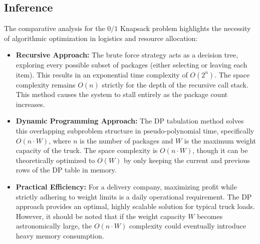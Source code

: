 \documentclass[a4paper,12pt]{article}
\begin{document}
\subsection*{Inference}
The comparative analysis for the $0/1$ Knapsack problem highlights the necessity of algorithmic optimization in logistics and resource allocation:
\begin{itemize}
    \item \textbf{Recursive Approach:} The brute force strategy acts as a decision tree, exploring every possible subset of packages (either selecting or leaving each item). This results in an exponential time complexity of $O(2^n)$. The space complexity remains $O(n)$ strictly for the depth of the recursive call stack. This method causes the system to stall entirely as the package count increases.
    \item \textbf{Dynamic Programming Approach:} The DP tabulation method solves this overlapping subproblem structure in pseudo-polynomial time, specifically $O(n \cdot W)$, where $n$ is the number of packages and $W$ is the maximum weight capacity of the truck. The space complexity is $O(n \cdot W)$, though it can be theoretically optimized to $O(W)$ by only keeping the current and previous rows of the DP table in memory.
    \item \textbf{Practical Efficiency:} For a delivery company, maximizing profit while strictly adhering to weight limits is a daily operational requirement. The DP approach provides an optimal, highly scalable solution for typical truck loads. However, it should be noted that if the weight capacity $W$ becomes astronomically large, the $O(n \cdot W)$ complexity could eventually introduce heavy memory consumption.
\end{itemize}

\newpage
\end{document}

